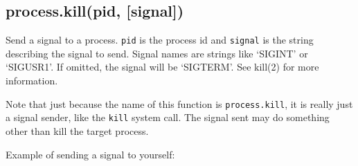 \begin{Shaded}
\begin{Highlighting}[]
\NormalTok{\{ }\NormalTok{:}
   \NormalTok{\{ }\NormalTok{: [],}
     \NormalTok{: }\NormalTok{,}
     \NormalTok{: [],}
     \NormalTok{: [],}
     \NormalTok{: [] \},}
  \NormalTok{:}
   \NormalTok{\{ }\NormalTok{: }\NormalTok{,}
     \NormalTok{: }\NormalTok{,}
     \NormalTok{: }\NormalTok{,}
     \NormalTok{: }\NormalTok{,}
     \NormalTok{: }\NormalTok{,}
     \NormalTok{: }\NormalTok{,}
     \NormalTok{: }\NormalTok{,}
     \NormalTok{: }\NormalTok{,}
     \NormalTok{: }\NormalTok{,}
     \NormalTok{: }\NormalTok{,}
     \NormalTok{: }\NormalTok{,}
     \NormalTok{: }\NormalTok{,}
     \NormalTok{: }\NormalTok{,}
     \NormalTok{: } \NormalTok{\} \}}
\end{Highlighting}
\end{Shaded}

\subsection{process.kill(pid, {[}signal{]})}

Send a signal to a process. \texttt{pid} is the process id and
\texttt{signal} is the string describing the signal to send. Signal
names are strings like `SIGINT' or `SIGUSR1'. If omitted, the signal
will be `SIGTERM'. See kill(2) for more information.

Note that just because the name of this function is
\texttt{process.kill}, it is really just a signal sender, like the
\texttt{kill} system call. The signal sent may do something other than
kill the target process.

Example of sending a signal to yourself:

